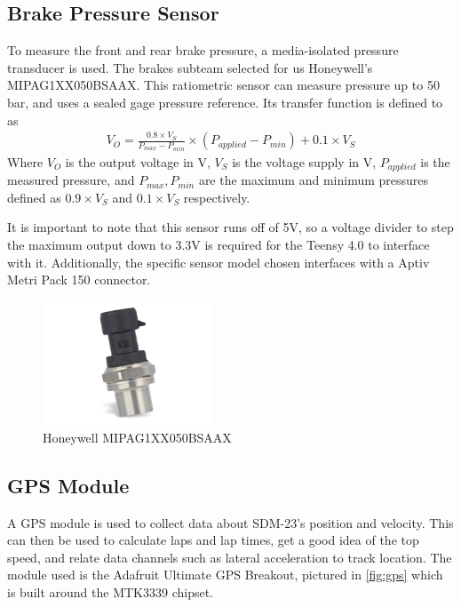 \subsection{Brake Pressure Sensor}
To measure the front and rear brake pressure, a media-isolated pressure transducer is used.
The brakes subteam selected for us Honeywell's MIPAG1XX050BSAAX.
This ratiometric sensor can measure pressure up to 50 bar, and uses a sealed gage pressure reference.
Its transfer function is defined to as
\begin{gather}\label{eq:bps}
    V_O = \frac{0.8\times V_S}{P_{max}-P_{min}}\times(P_{applied}-P_{min})+0.1\times V_S
\end{gather}
Where $V_O$ is the output voltage in V, $V_S$ is the voltage supply in V, $P_{applied}$ is the measured pressure, and $P_{max},P_{min}$ are the maximum and minimum pressures defined as $0.9\times V_S$ and $0.1\times V_S$ respectively.

It is important to note that this sensor runs off of 5V, so a voltage divider to step the maximum output down to 3.3V is required for the Teensy 4.0 to interface with it.
Additionally, the specific sensor model chosen interfaces with a Aptiv Metri Pack 150 connector.
\begin{figure}[H]
    \centering
    \includegraphics[width=2in]{images/mips.png}
    \caption{Honeywell MIPAG1XX050BSAAX}
    \label{fig:mips}
\end{figure}

\subsection{GPS Module}
A GPS module is used to collect data about SDM-23's position and velocity.
This can then be used to calculate laps and lap times, get a good idea of the top speed, and relate data channels such as lateral acceleration to track location.
The module used is the Adafruit Ultimate GPS Breakout, pictured in \ref{fig:gps} which is built around the MTK3339 chipset.

